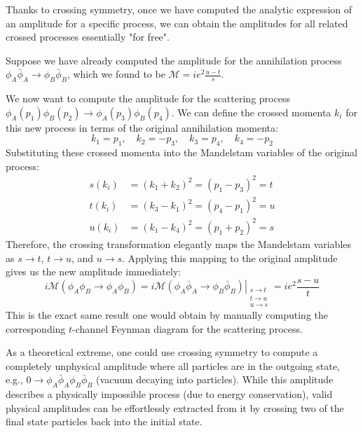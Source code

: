 Thanks to crossing symmetry, once we have computed the analytic expression of an amplitude for a specific process, we can obtain the amplitudes for all related crossed processes essentially "for free".

\begin{example}
    Suppose we have already computed the amplitude for the annihilation process $\phi_A \bar{\phi}_A \to \phi_B \bar{\phi}_B$, which we found to be $\mathcal{M} = ie^2 \frac{u-t}{s}$.

    We now want to compute the amplitude for the scattering process $\phi_A(p_1) \phi_B(p_2) \to \phi_A(p_3) \phi_B(p_4)$. We can define the crossed momenta $k_i$ for this new process in terms of the original annihilation momenta:
    \[
        k_1 = p_1, \quad k_2 = -p_3, \quad k_3 = p_4, \quad k_4 = -p_2
    \]
    Substituting these crossed momenta into the Mandelstam variables of the original process:
    \begin{align*}
        s(k_i) & = (k_1 + k_2)^2 = (p_1 - p_3)^2 = t \\
        t(k_i) & = (k_3 - k_1)^2 = (p_4 - p_1)^2 = u \\
        u(k_i) & = (k_1 - k_4)^2 = (p_1 + p_2)^2 = s
    \end{align*}
    Therefore, the crossing transformation elegantly maps the Mandelstam variables as $s \to t$, $t \to u$, and $u \to s$. Applying this mapping to the original amplitude gives us the new amplitude immediately:
    \[
        i\mathcal{M}(\phi_A \phi_B \to \phi_A \phi_B) = \left. i\mathcal{M}(\phi_A \bar{\phi}_A \to \phi_B \bar{\phi}_B) \right|_{\substack{s \to t \\ t \to u \\ u \to s}} = ie^2 \frac{s - u}{t}
    \]
    This is the exact same result one would obtain by manually computing the corresponding $t$-channel Feynman diagram for the scattering process.
\end{example}

As a theoretical extreme, one could use crossing symmetry to compute a completely unphysical amplitude where all particles are in the outgoing state, e.g., $0 \to \phi_A \bar{\phi}_A \phi_B \bar{\phi}_B$ (vacuum decaying into particles). While this amplitude describes a physically impossible process (due to energy conservation), valid physical amplitudes can be effortlessly extracted from it by crossing two of the final state particles back into the initial state.


